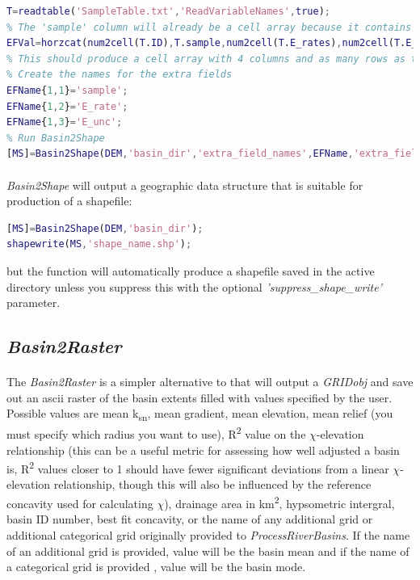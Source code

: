 \begin{lstlisting}[language=Matlab]
% Load in your text file into a table specifying that it has a header containing the variable names, this is the easiest way to import mixed data containing both characters and numbers
T=readtable('SampleTable.txt','ReadVariableNames',true);
% The 'sample' column will already be a cell array because it contains characters, but the other columns will be numeric arrays so you will need to convert them to cell arrays and then horizontally concatenate them together
EFVal=horzcat(num2cell(T.ID),T.sample,num2cell(T.E_rates),num2cell(T.E_unc));
% This should produce a cell array with 4 columns and as many rows as there are basins
% Create the names for the extra fields
EFName{1,1}='sample';
EFName{1,2}='E_rate';
EFName{1,3}='E_unc';
% Run Basin2Shape
[MS]=Basin2Shape(DEM,'basin_dir','extra_field_names',EFName,'extra_field_values',EFVal);
\end{lstlisting} 

\paragraph{}\textit{Basin2Shape} will output a geographic data structure that is suitable for production of a shapefile:

\begin{lstlisting}[language=Matlab]
[MS]=Basin2Shape(DEM,'basin_dir');
shapewrite(MS,'shape_name.shp');
\end{lstlisting}

\noindent
but the function will automatically produce a shapefile saved in the active directory unless you suppress this with the optional \textit{'suppress\_shape\_write'} parameter. 

\subsection{\textit{Basin2Raster}}
\paragraph{}The \textit{Basin2Raster} is a simpler alternative to  that will output a \textit{GRIDobj} and save out an ascii raster of the basin extents filled with values specified by the user. Possible values are mean k\textsubscript{sn}, mean gradient, mean elevation, mean relief (you must specify which radius you want to use), R\textsuperscript{2} value on the $\chi$-elevation relationship (this can be a useful metric for assessing how well adjusted a basin is, R\textsuperscript{2} values closer to 1 should have fewer significant deviations from a linear $\chi$-elevation relationship, though this will also be influenced by the reference concavity used for calculating $\chi$), drainage area in km\textsuperscript{2}, hypsometric intergral, basin ID number, best fit concavity, or the name of any additional grid or additional categorical grid originally provided to \textit{ProcessRiverBasins}. If the name of an additional grid is provided, value will be the basin mean and if the name of a categorical grid is provided , value will be the basin mode. 

